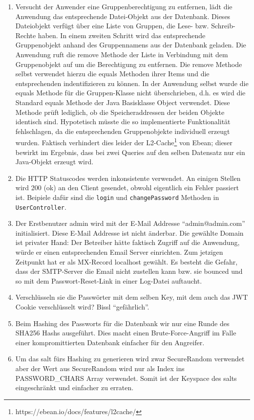 \documentclass[12pt,DIV14,BCOR10mm,a4paper,parskip=half-,headsepline,headinclude,english,ngerman,bibliography=totocnumbered]{scrreprt}
\begin{document}
\begin{enumerate}[resume]
  \item Versucht der Anwender eine Gruppenberechtigung zu entfernen, lädt die Anwendung das entsprechende Datei-Objekt aus der Datenbank. Dieses Dateiobjekt verfügt über eine Liste von Gruppen, die Lese- bzw. Schreib-Rechte haben. In einem zweiten Schritt wird das entsprechende Gruppenobjekt anhand des Gruppennamens aus der Datenbank geladen. Die Anwendung ruft die remove Methode der Liste in Verbindung mit dem Gruppenobjekt auf um die Berechtigung zu entfernen. Die remove Methode selbst verwendet hierzu die equals Methoden ihrer Items und die entsprechenden indentifizieren zu können. In der Anwendung selbst wurde die equals Methode für die Gruppen-Klasse nicht überschrieben, d.h. es wird die Standard equals Methode der Java Basisklasse Object verwendet. Diese Methode prüft lediglich, ob die Speicheraddressen der beiden Objekte identisch sind. Hypotetisch müsste die so implementierte Funktionalität fehlschlagen, da die entsprechenden Gruppenobjekte individuell erzeugt wurden. Faktisch verhindert dies leider der L2-Cache\footnote{https://ebean.io/docs/features/l2cache/} von Ebean; dieser bewirkt im Ergebnis, dass bei zwei Queries auf den selben Datensatz nur ein Java-Objekt erzeugt wird.
  	\item Die HTTP Statuscodes werden inkonsistente verwendet. An einigen Stellen wird 200 (ok) an den Client gesendet, obwohl eigentlich ein Fehler passiert ist. Beipiele dafür sind die \texttt{login} und \texttt{changePassword} Methoden in \texttt{UserController}.
  	\item Der Erstbenutzer admin wird mit der E-Mail Addresse \enquote{admin@admin.com} initialisiert. Diese E-Mail Addresse ist nicht änderbar. Die gewählte Domain ist privater Hand: Der Betreiber hätte faktisch Zugriff auf die Anwendung, würde er einen entsprechenden Email Server einrichten. Zum jetzigen Zeitpunkt hat er als MX-Record localhost gewählt. Es besteht die Gefahr, dass der SMTP-Server die Email nicht zustellen kann bzw. sie bounced und so mit dem Passwort-Reset-Link in einer Log-Datei auftaucht.
    \item Verschlüsseln sie die Passwörter mit dem selben Key, mit dem auch das JWT Cookie verschlüsselt wird? Bissl \enquote{gefährlich}.
    \item Beim Hashing des Passworts für die Datenbank wir nur eine Runde des SHA256 Hashs ausgeführt. Dies macht einen Brute-Force-Angriff im Falle einer kompromittierten Datenbank einfacher für den Angreifer.
    \item Um das salt fürs Hashing zu generieren wird zwar SecureRandom verwendet aber der Wert aus SecureRandom wird nur als Index ins PASSWORD\_CHARS Array verwendet. Somit ist der Keyspace des salts eingeschränkt und einfacher zu erraten.
\end{enumerate}
\end{document}

